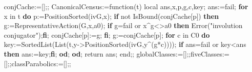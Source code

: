 \documentclass[
  10pt,
  letterpaper,
]{article}
\newenvironment{Shaded}{}{}
\newcommand{\BuiltInTok}[1]{\textcolor[rgb]{0.00,0.50,0.00}{#1}}
\newcommand{\ConstantTok}[1]{\textcolor[rgb]{0.53,0.00,0.00}{#1}}
\newcommand{\ControlFlowTok}[1]{\textcolor[rgb]{0.00,0.44,0.13}{\textbf{#1}}}
\newcommand{\ExtensionTok}[1]{#1}
\newcommand{\FunctionTok}[1]{\textcolor[rgb]{0.02,0.16,0.49}{#1}}
\newcommand{\NormalTok}[1]{#1}
\newcommand{\OperatorTok}[1]{\textcolor[rgb]{0.40,0.40,0.40}{#1}}
\newcommand{\StringTok}[1]{\textcolor[rgb]{0.25,0.44,0.63}{#1}}
\newcommand{\VariableTok}[1]{\textcolor[rgb]{0.10,0.09,0.49}{#1}}
\begin{document}
\begin{Shaded}
\begin{Highlighting}[]
\VariableTok{conjCache}\OperatorTok{:=}\NormalTok{[]}\OperatorTok{;;}
\VariableTok{CanonicalCensus}\OperatorTok{:=}\FunctionTok{function}\NormalTok{(}\VariableTok{t}\NormalTok{)}
 \ExtensionTok{local} \VariableTok{ans}\OperatorTok{,}\VariableTok{x}\OperatorTok{,}\VariableTok{p}\OperatorTok{,}\VariableTok{g}\OperatorTok{,}\VariableTok{c}\OperatorTok{,}\VariableTok{key}\OperatorTok{;}
 \VariableTok{ans}\OperatorTok{:=}\ConstantTok{fail}\OperatorTok{;}
 \ControlFlowTok{for} \VariableTok{x} \ExtensionTok{in} \VariableTok{t} \ControlFlowTok{do}
  \VariableTok{p}\OperatorTok{:=}\BuiltInTok{PositionSorted}\NormalTok{(}\VariableTok{ivG}\OperatorTok{,}\VariableTok{x}\NormalTok{)}\OperatorTok{;}
  \ControlFlowTok{if} \ConstantTok{not} \BuiltInTok{IsBound}\NormalTok{(}\VariableTok{conjCache}\NormalTok{[}\VariableTok{p}\NormalTok{]) }\ControlFlowTok{then}
   \VariableTok{g}\OperatorTok{:=}\BuiltInTok{RepresentativeAction}\NormalTok{(}\VariableTok{G}\OperatorTok{,}\VariableTok{x}\OperatorTok{,}\VariableTok{a0}\NormalTok{)}\OperatorTok{;}
   \ControlFlowTok{if} \VariableTok{g}\OperatorTok{=}\ConstantTok{fail} \ConstantTok{or} \VariableTok{x}\OperatorTok{\^{}}\VariableTok{g}\OperatorTok{\textless{}\textgreater{}}\VariableTok{a0} \ControlFlowTok{then} \BuiltInTok{Error}\NormalTok{(}\StringTok{"involution conjugator"}\NormalTok{)}\OperatorTok{;}\ControlFlowTok{fi}\OperatorTok{;}
   \VariableTok{conjCache}\NormalTok{[}\VariableTok{p}\NormalTok{]}\OperatorTok{:=}\VariableTok{g}\OperatorTok{;}
  \ControlFlowTok{fi}\OperatorTok{;}
  \VariableTok{g}\OperatorTok{:=}\VariableTok{conjCache}\NormalTok{[}\VariableTok{p}\NormalTok{]}\OperatorTok{;}
  \ControlFlowTok{for} \VariableTok{c} \ExtensionTok{in} \VariableTok{C0} \ControlFlowTok{do}
   \VariableTok{key}\OperatorTok{:=}\BuiltInTok{SortedList}\NormalTok{(}\BuiltInTok{List}\NormalTok{(}\VariableTok{t}\OperatorTok{,}\VariableTok{y}\OperatorTok{{-}\textgreater{}}\BuiltInTok{PositionSorted}\NormalTok{(}\VariableTok{ivG}\OperatorTok{,}\VariableTok{y}\OperatorTok{\^{}}\NormalTok{(}\VariableTok{g}\OperatorTok{*}\VariableTok{c}\NormalTok{))))}\OperatorTok{;}
   \ControlFlowTok{if} \VariableTok{ans}\OperatorTok{=}\ConstantTok{fail} \ConstantTok{or} \VariableTok{key}\OperatorTok{\textless{}}\VariableTok{ans} \ControlFlowTok{then} \VariableTok{ans}\OperatorTok{:=}\VariableTok{key}\OperatorTok{;}\ControlFlowTok{fi}\OperatorTok{;}
  \ControlFlowTok{od}\OperatorTok{;}
 \ControlFlowTok{od}\OperatorTok{;}
 \ExtensionTok{return} \VariableTok{ans}\OperatorTok{;}
\FunctionTok{end}\OperatorTok{;;}
\VariableTok{globalClasses}\OperatorTok{:=}\NormalTok{[]}\OperatorTok{;;}\VariableTok{fiveClasses}\OperatorTok{:=}\NormalTok{[]}\OperatorTok{;;}\VariableTok{classParabolics}\OperatorTok{:=}\NormalTok{[]}\OperatorTok{;;}

\end{Highlighting}
\end{Shaded}
\end{document}
